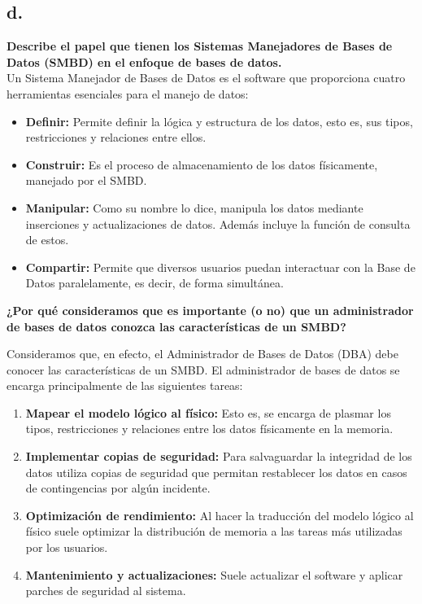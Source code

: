 
\subsection*{d.}

\textbf{Describe el papel que tienen los Sistemas Manejadores de Bases de Datos (SMBD) en el enfoque de bases de datos.}\\
Un Sistema Manejador de Bases de Datos es el software que proporciona cuatro herramientas esenciales para el manejo de datos:
\begin{itemize}
    \item \textbf{Definir:} Permite definir la lógica y estructura de los datos, esto es, sus tipos, restricciones y relaciones entre ellos.
    
    \item \textbf{Construir:} Es el proceso de almacenamiento de los datos físicamente, manejado por el SMBD.
    
    \item \textbf{Manipular:} Como su nombre lo dice, manipula los datos mediante inserciones y actualizaciones de datos. Además incluye la función de consulta de estos.

    \item \textbf{Compartir:} Permite que diversos usuarios puedan interactuar con la Base de Datos paralelamente, es decir, de forma simultánea. 
    
\end{itemize}

\textbf{¿Por qué consideramos que es importante (o no) que un administrador de bases de datos conozca las características de un SMBD?}

Consideramos que, en efecto, el Administrador de Bases de Datos (DBA) debe conocer las características de un SMBD.
El administrador de bases de datos se encarga principalmente de las siguientes tareas:
\begin{enumerate}
    \item \textbf{Mapear el modelo lógico al físico:} Esto es, se encarga de plasmar los tipos, restricciones y relaciones entre los datos físicamente en la memoria.
    \item \textbf{Implementar copias de seguridad:} Para salvaguardar la integridad de los datos utiliza copias de seguridad que permitan restablecer los datos en casos de contingencias por algún incidente.
    \item \textbf{Optimización de rendimiento:} Al hacer la traducción del modelo lógico al físico suele optimizar la distribución de memoria a las tareas más utilizadas por los usuarios.
    \item \textbf{Mantenimiento y actualizaciones:} Suele actualizar el software y aplicar parches de seguridad al sistema.
\end{enumerate}

